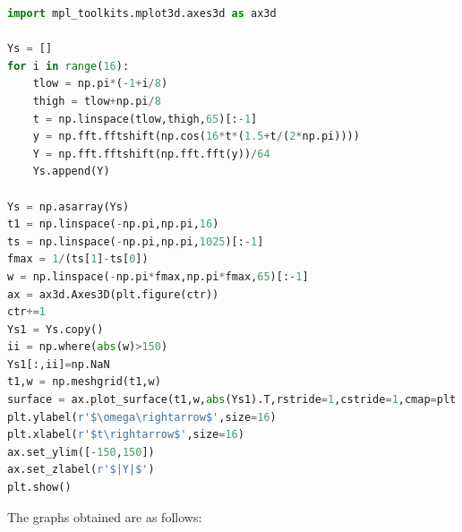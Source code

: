 \documentclass[12pt]{article}
\begin{document}
\begin{lstlisting}[language=Python]
import mpl_toolkits.mplot3d.axes3d as ax3d

Ys = []
for i in range(16):
    tlow = np.pi*(-1+i/8)
    thigh = tlow+np.pi/8
    t = np.linspace(tlow,thigh,65)[:-1]
    y = np.fft.fftshift(np.cos(16*t*(1.5+t/(2*np.pi))))
    Y = np.fft.fftshift(np.fft.fft(y))/64
    Ys.append(Y)

Ys = np.asarray(Ys)
t1 = np.linspace(-np.pi,np.pi,16)
ts = np.linspace(-np.pi,np.pi,1025)[:-1]
fmax = 1/(ts[1]-ts[0])
w = np.linspace(-np.pi*fmax,np.pi*fmax,65)[:-1]
ax = ax3d.Axes3D(plt.figure(ctr))
ctr+=1
Ys1 = Ys.copy()
ii = np.where(abs(w)>150)
Ys1[:,ii]=np.NaN
t1,w = np.meshgrid(t1,w)
surface = ax.plot_surface(t1,w,abs(Ys1).T,rstride=1,cstride=1,cmap=plt.get_cmap("jet"))
plt.ylabel(r'$\omega\rightarrow$',size=16)
plt.xlabel(r'$t\rightarrow$',size=16)
ax.set_ylim([-150,150])
ax.set_zlabel(r'$|Y|$')
plt.show()
\end{lstlisting}
\pagebreak
The graphs obtained are as follows:
\end{document}
